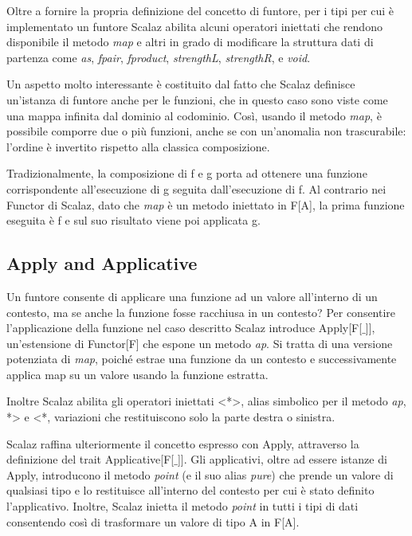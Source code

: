 Oltre a fornire la propria definizione del concetto di funtore, per i tipi per cui è implementato un funtore Scalaz abilita alcuni operatori iniettati che rendono disponibile il metodo \textit{map} e altri in grado di modificare la struttura dati di partenza come \textit{as}, \textit{fpair}, \textit{fproduct}, \textit{strengthL}, \textit{strengthR}, e \textit{void}.

Un aspetto molto interessante è costituito dal fatto che Scalaz definisce un'istanza di funtore anche per le funzioni, che in questo caso sono viste come una mappa infinita dal dominio al codominio. Così, usando il metodo \textit{map}, è possibile comporre due o più funzioni, anche se con un'anomalia non trascurabile: l'ordine è invertito rispetto alla classica composizione.

Tradizionalmente, la composizione di f e g porta ad ottenere una funzione corrispondente all'esecuzione di g seguita dall'esecuzione di f. Al contrario nei Functor di Scalaz, dato che \textit{map} è un metodo iniettato in F[A], la prima funzione eseguita è f e sul suo risultato viene poi applicata g.



\subsection{Apply and Applicative}

Un funtore consente di applicare una funzione ad un valore all'interno di un contesto, ma se anche la funzione fosse racchiusa in un contesto? Per consentire l'applicazione della funzione nel caso descritto Scalaz introduce Apply[F[$\_$]], un'estensione di Functor[F] che espone un metodo \textit{ap}. Si tratta di una versione potenziata di \textit{map}, poiché estrae una funzione da un contesto e successivamente applica map su un valore usando la funzione estratta. 

Inoltre Scalaz abilita gli operatori iniettati <*>, alias simbolico per il metodo \textit{ap}, *> e <*, variazioni che restituiscono solo la parte destra o sinistra.

Scalaz raffina ulteriormente il concetto espresso con Apply, attraverso la definizione del trait Applicative[F[$\_$]]. Gli applicativi, oltre ad essere istanze di Apply, introducono il metodo \textit{point} (e il suo alias \textit{pure}) che prende un valore di qualsiasi tipo e lo restituisce all'interno del contesto per cui è stato definito l'applicativo. Inoltre, Scalaz inietta il metodo \textit{point} in tutti i tipi di dati consentendo così di trasformare un valore di tipo A in F[A].


